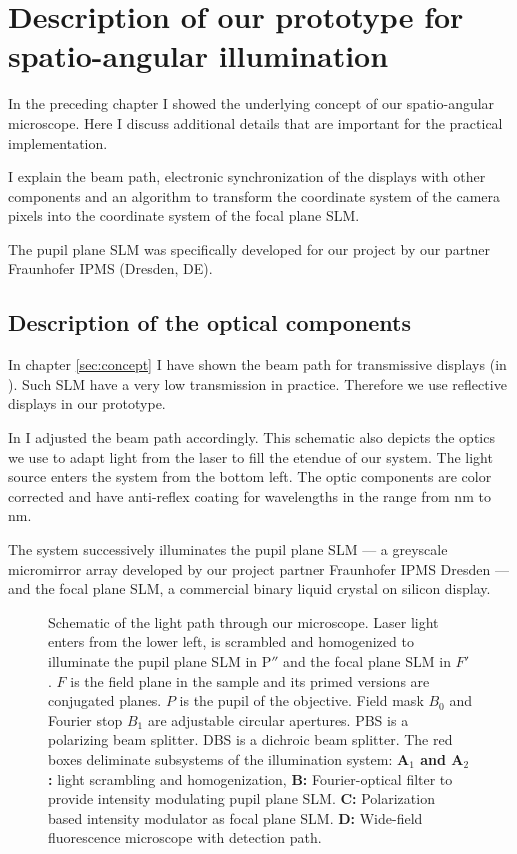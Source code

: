 
\chapter{Description of our prototype for spatio-angular illumination}
\label{sec:dev1}
\begin{summary}
  In the preceding chapter I showed the underlying concept of our
  spatio-angular microscope. Here I discuss additional details that
  are important for the practical implementation.

  I explain the beam path, electronic synchronization of the displays
  with other components and an algorithm to transform the coordinate
  system of the camera pixels into the coordinate system of the focal
  plane SLM.
  
  The pupil plane SLM was specifically developed for our project by    
  our partner Fraunhofer IPMS (Dresden, DE). 
\end{summary}
\section{Description of the optical components}
In chapter \ref{sec:concept} I have shown the beam path for
transmissive displays (in ). Such SLM have a
very low transmission in practice. Therefore we use reflective
displays in our prototype.

In  I adjusted the beam path accordingly. This
schematic also depicts the optics we use to adapt light from the laser
to fill the etendue of our system. The light source enters the system
from the bottom left. The optic components are color corrected and
have anti-reflex coating for wavelengths in the range from
\unit[400]{nm} to \unit[700]{nm}.

The system successively illuminates the pupil plane SLM --- a greyscale
micromirror array developed by our project partner Fraunhofer IPMS
Dresden --- and the focal plane SLM, a commercial binary liquid crystal
on silicon display.
 
\begin{figure}[!htbp]
  \centering
  \caption{Schematic of the light path through our microscope. Laser
    light enters from the lower left, is scrambled and homogenized to
    illuminate the pupil plane SLM in $\textrm{P}''$ and the focal
    plane SLM in $F'$. $F$ is the field plane in the sample and its
    primed versions are conjugated planes. $P$ is the pupil of the
    objective. Field mask $B_0$ and Fourier stop $B_1$ are adjustable
    circular apertures. PBS is a polarizing beam splitter. DBS is a
    dichroic beam splitter.  The red boxes deliminate subsystems of
    the illumination system: {\color{Orchid}\bf A$_1$ and A$_2$:}
    light scrambling and homogenization, {\color{Orchid}\bf B:}
    Fourier-optical filter to provide intensity modulating pupil plane
    SLM. {\color{Orchid}\bf C:} Polarization based intensity modulator
    as focal plane SLM. {\color{Orchid}\bf D:} Wide-field fluorescence
    microscope with detection path.}
  \label{fig:memi-real}
\end{figure}

